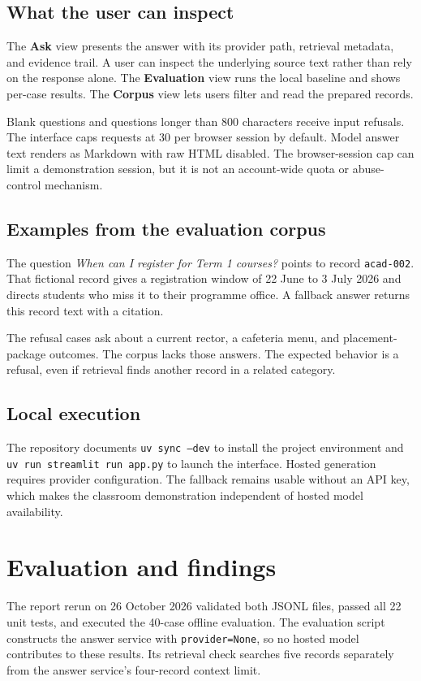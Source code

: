 \documentclass[11pt,a4paper]{article}
\begin{document}
\subsection{What the user can inspect}
The \textbf{Ask} view presents the answer with its provider path, retrieval metadata, and evidence trail. A user can inspect the underlying source text rather than rely on the response alone. The \textbf{Evaluation} view runs the local baseline and shows per-case results. The \textbf{Corpus} view lets users filter and read the prepared records.

Blank questions and questions longer than 800 characters receive input refusals. The interface caps requests at 30 per browser session by default. Model answer text renders as Markdown with raw HTML disabled. The browser-session cap can limit a demonstration session, but it is not an account-wide quota or abuse-control mechanism.

\subsection{Examples from the evaluation corpus}
The question \textit{When can I register for Term 1 courses?} points to record \texttt{acad-002}. That fictional record gives a registration window of 22 June to 3 July 2026 and directs students who miss it to their programme office. A fallback answer returns this record text with a citation.

The refusal cases ask about a current rector, a cafeteria menu, and placement-package outcomes. The corpus lacks those answers. The expected behavior is a refusal, even if retrieval finds another record in a related category.

\subsection{Local execution}
The repository documents \texttt{uv sync --dev} to install the project environment and \texttt{uv run streamlit run app.py} to launch the interface. Hosted generation requires provider configuration. The fallback remains usable without an API key, which makes the classroom demonstration independent of hosted model availability.

\newpage
\section{Evaluation and findings}
The report rerun on 26 October 2026 validated both JSONL files, passed all 22 unit tests, and executed the 40-case offline evaluation. The evaluation script constructs the answer service with \texttt{provider=None}, so no hosted model contributes to these results. Its retrieval check searches five records separately from the answer service's four-record context limit.
\end{document}
